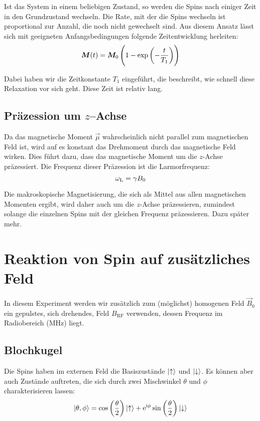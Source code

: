 Ist das System in einem beliebigen Zustand, so werden die Spins nach einiger
Zeit in den Grundzustand wechseln. Die Rate, mit der die Spins wechseln ist
proportional zur Anzahl, die noch nicht gewechselt sind. Aus diesem Ansatz
lässt sich mit geeigneten Anfangsbedingungen folgende Zeitentwicklung
herleiten: \parencite[Formel~P443.2]{physik412-Anleitung}
\begin{equation}
    \label{eq:M/exp}
    \vec M(t) = \vec M_0 \del{1 - \exp\del{- \frac{t}{T_1}}}
\end{equation}

Dabei haben wir die Zeitkonstante $T_1$ eingeführt, die beschreibt, wie schnell
diese Relaxation vor sich geht. Diese Zeit ist relativ lang.

\subsection{Präzession um $z$–Achse}
\label{subsec:Präzession}

Da das magnetische Moment $\vec\mu$ wahrscheinlich nicht parallel zum
magnetischen Feld ist, wird auf es konstant das Drehmoment durch das
magnetische Feld wirken. Dies führt dazu, dass das magnetische Moment um die
$z$-Achse präzessiert. Die Frequenz dieser Präzession ist die Larmorfrequenz:
\[
    \omega_\text L = \gamma B_0
\]

Die makroskopische Magnetisierung, die sich als Mittel aus allen magnetischen
Momenten ergibt, wird daher auch um die $z$-Achse präzessieren, zumindest
solange die einzelnen Spins mit der gleichen Frequenz präzessieren. Dazu später
mehr.

\section{Reaktion von Spin auf zusätzliches Feld}

In diesem Experiment werden wir zusätzlich zum (möglichst) homogenen Feld $\vec
B_0$ ein gepulstes, sich drehendes, Feld $B_\text{RF}$ verwenden, dessen
Frequenz im Radiobereich (\si{\mega\hertz}) liegt.

\subsection{Blochkugel}

Die Spins haben im externen Feld die Basiszustände $\ket\uparrow$ und
$\ket\downarrow$. Es können aber auch Zustände auftreten, die sich durch zwei
Mischwinkel $\theta$ und $\phi$ charakterisieren lassen:
\parencite{wikipedia/bloch_kugel}
\[
    \ket{\theta, \phi}
    = \cos\del{\frac\theta2} \ket\uparrow
    + \eup^{\iup \phi} \sin\del{\frac\theta2} \ket\downarrow
\]

